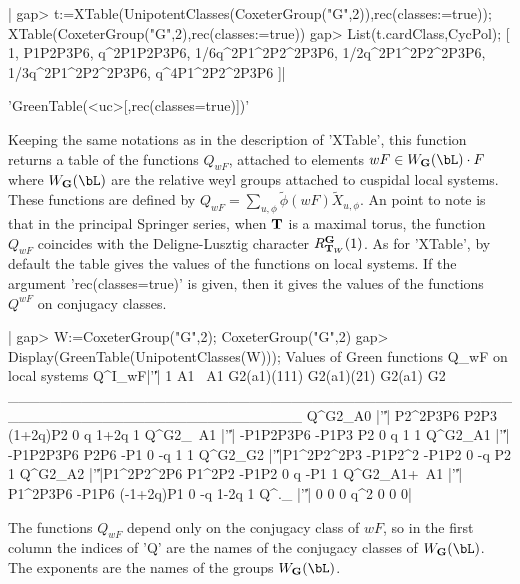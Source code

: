 |   gap> t:=XTable(UnipotentClasses(CoxeterGroup("G",2)),rec(classes:=true));
   XTable(CoxeterGroup("G",2),rec(classes:=true))
   gap> List(t.cardClass,CycPol);
   [ 1, P1P2P3P6, q^2P1P2P3P6, 1/6q^2P1^2P2^2P3P6, 1/2q^2P1^2P2^2P3P6,
     1/3q^2P1^2P2^2P3P6, q^4P1^2P2^2P3P6 ]|


'GreenTable(<uc>[,rec(classes\:=true)])'

Keeping the same notations as in the description of 'XTable', this function
returns  a table  of the  functions $Q_{wF}$,  attached to  elements $wF\in
W_\bG(\bL)\cdot F$ where $W_\bG(\bL)$ are the relative weyl groups attached
to cuspidal local systems. These functions are defined by
$Q_{wF}=\sum_{u,\phi}  \tilde\phi(wF) \tilde X_{u,\phi}$.  An point to note
is  that in the principal  Springer series, when ${\bf T}$  is a maximal torus,
the   function  $Q_{wF}$  coincides   with  the  Deligne-Lusztig  character
$R^{\bf G}_{{\bf T}_W}(1)$.  As for 'XTable', by default the table gives the values
of the functions on local systems. If the argument 'rec(classes\:=true)' is
given,  then it  gives the  values of  the functions  $Q^{wF}$ on conjugacy
classes.

|   gap> W:=CoxeterGroup("G",2);
   CoxeterGroup("G",2)
   gap> Display(GreenTable(UnipotentClasses(W)));
   Values of Green functions Q_{wF} on local systems
   Q^I_wF\class |'\|'|         1      A1       ~A1 G2(a1)(111) G2(a1)(21) G2(a1) G2
   ____________________________________________________________________________
   Q^G2_A0      |'\|'|  P2^2P3P6    P2P3  (1+2q)P2           0          q   1+2q  1
   Q^G2_~A1     |'\|'| -P1P2P3P6   -P1P3        P2           0          q      1  1
   Q^G2_A1      |'\|'| -P1P2P3P6    P2P6       -P1           0         -q      1  1
   Q^G2_G2      |'\|'|P1^2P2^2P3 -P1P2^2     -P1P2           0         -q     P2  1
   Q^G2_A2      |'\|'|P1^2P2^2P6  P1^2P2     -P1P2           0          q    -P1  1
   Q^G2_A1+~A1  |'\|'|  P1^2P3P6   -P1P6 (-1+2q)P1           0         -q   1-2q  1
   Q^._         |'\|'|         0       0         0         q^2          0      0  0|

The  functions $Q_{wF}$ depend only  on the conjugacy class  of $wF$, so in
the  first column the indices of 'Q' are the names of the conjugacy classes
of $W_\bG(\bL)$. The exponents are the names of the groups $W_\bG(\bL)$.

